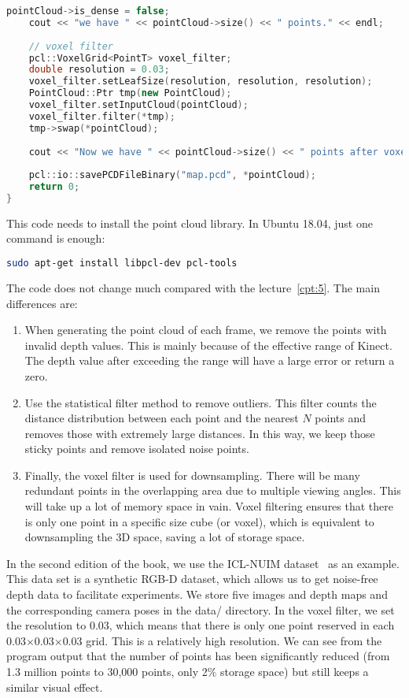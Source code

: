 \begin{lstlisting}[language=c++,caption=slambook/ch12/dense\_RGBD/pointcloud\_mapping.cpp (part)]
	pointCloud->is_dense = false;
	cout << "we have " << pointCloud->size() << " points." << endl;
	
	// voxel filter 
	pcl::VoxelGrid<PointT> voxel_filter;
	double resolution = 0.03;
	voxel_filter.setLeafSize(resolution, resolution, resolution);       // resolution
	PointCloud::Ptr tmp(new PointCloud);
	voxel_filter.setInputCloud(pointCloud);
	voxel_filter.filter(*tmp);
	tmp->swap(*pointCloud);
	
	cout << "Now we have " << pointCloud->size() << " points after voxel filtering." << endl;
	
	pcl::io::savePCDFileBinary("map.pcd", *pointCloud);
	return 0;
}
\end{lstlisting}

This code needs to install the point cloud library. In Ubuntu 18.04, just one command is enough:
\begin{lstlisting}[language=sh, caption=Terminal input:]
sudo apt-get install libpcl-dev pcl-tools
\end{lstlisting}

The code does not change much compared with the lecture~\ref{cpt:5}. The main differences are:
\begin{enumerate}
	\item When generating the point cloud of each frame, we remove the points with invalid depth values. This is mainly because of the effective range of Kinect. The depth value after exceeding the range will have a large error or return a zero.
	\item Use the statistical filter method to remove outliers. This filter counts the distance distribution between each point and the nearest $N$ points and removes those with extremely large distances. In this way, we keep those sticky points and remove isolated noise points.
	\item Finally, the voxel filter is used for downsampling. There will be many redundant points in the overlapping area due to multiple viewing angles. This will take up a lot of memory space in vain. Voxel filtering ensures that there is only one point in a specific size cube (or voxel), which is equivalent to downsampling the 3D space, saving a lot of storage space.
\end{enumerate}

In the second edition of the book, we use the ICL-NUIM dataset~\cite{Handa2014} as an example. This data set is a synthetic RGB-D dataset, which allows us to get noise-free depth data to facilitate experiments. We store five images and depth maps and the corresponding camera poses in the data/ directory. In the voxel filter, we set the resolution to 0.03, which means that there is only one point reserved in each 0.03$\times$0.03$\times$0.03 grid. This is a relatively high resolution. We can see from the program output that the number of points has been significantly reduced (from 1.3 million points to 30,000 points, only 2$ \%$ storage space) but still keeps a similar visual effect.

